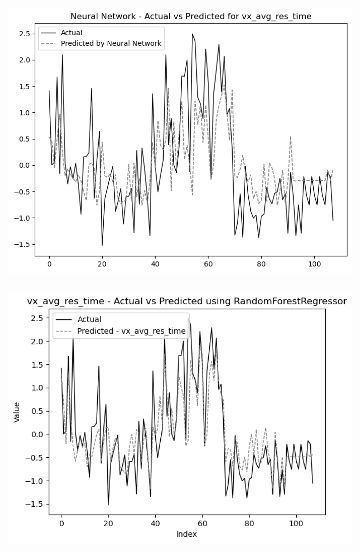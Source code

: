 \begin{figure}
    \begin{subfigure}[b]{0.49\textwidth}
        \centering
        \includegraphics[width=\textwidth]{images/nnCharts/all_data_visual_avg_response_time.png}
        
    \end{subfigure}\hfill
    \begin{subfigure}[b]{0.49\textwidth}
        \centering
        \includegraphics[width=\textwidth]{images/regressionCharts/all_data_visual_average_response_time.png}
        
    \end{subfigure}
    

\end{figure}
